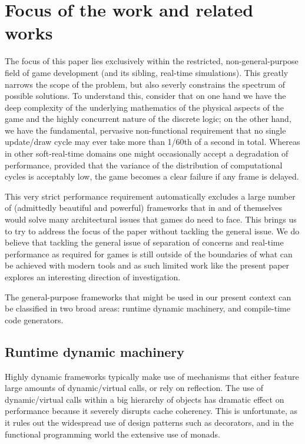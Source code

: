 \section{Focus of the work and related works}
\label{sec:focus}
The focus of this paper lies exclusively within the restricted, non-general-purpose field of game development (and its sibling, real-time simulations). This greatly narrows the scope of the problem, but also severly constrains the spectrum of possible solutions. To understand this, consider that on one hand we have the deep complexity of the underlying mathematics of the physical aspects of the game and the highly concurrent nature of the discrete logic; on the other hand, we have the fundamental, pervasive non-functional requirement that no single update/draw cycle may ever take more than 1/60th of a second in total. Whereas in other soft-real-time domains one might occasionally accept a degradation of performance, provided that the variance of the distribution of computational cycles is acceptably low, the game becomes a clear failure if any frame is delayed.

This very strict performance requirement automatically excludes a large number of (admittedly beautiful and powerful) frameworks that in and of themselves would solve many architectural issues that games do need to face. This brings us to try to address the focus of the paper without tackling the general issue. We do believe that tackling the general issue of separation of concerns and real-time performance as required for games is still outside of the boundaries of what can be achieved with modern tools and as such limited work like the present paper explores an interesting direction of investigation.

The general-purpose frameworks that might be used in our present context can be classified in two broad areas: runtime dynamic machinery, and compile-time code generators.

\subsection{Runtime dynamic machinery}
Highly dynamic frameworks typically make use of mechanisms that either feature large amounts of dynamic/virtual calls, or rely on reflection. The use of dynamic/virtual calls within a big hierarchy of objects has dramatic effect on performance \cite{ungar1992object} because it severely disrupts cache coherency. This is unfortunate, as it rules out the widespread use of design patterns such as decorators, and in the functional programming world the extensive use of monads.

